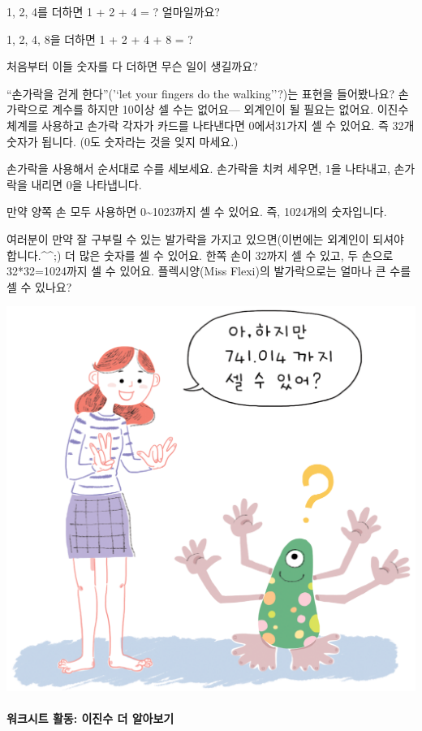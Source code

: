 \documentclass[]{article}
\begin{document}
1, 2, 4를 더하면 1 + 2 + 4 = ? 얼마일까요?

1, 2, 4, 8을 더하면 1 + 2 + 4 + 8 = ?

처음부터 이들 숫자를 다 더하면 무슨 일이 생길까요?

``손가락을 걷게 한다''('`let your fingers do the walking''?)는 표현을
들어봤나요? 손가락으로 계수를 하지만 10이상 셀 수는 없어요--- 외계인이
될 필요는 없어요. 이진수 체계를 사용하고 손가락 각자가 카드를 나타낸다면
0에서31가지 셀 수 있어요. 즉 32개 숫자가 됩니다. (0도 숫자라는 것을 잊지
마세요.)

손가락을 사용해서 순서대로 수를 세보세요. 손가락을 치켜 세우면, 1을
나타내고, 손가락을 내리면 0을 나타냅니다.

만약 양쪽 손 모두 사용하면 0\textasciitilde{}1023까지 셀 수 있어요. 즉,
1024개의 숫자입니다.

여러분이 만약 잘 구부릴 수 있는 발가락을 가지고 있으면(이번에는 외계인이
되셔야 합니다.\^{}\^{};) 더 많은 숫자를 셀 수 있어요. 한쪽 손이 32까지
셀 수 있고, 두 손으로 32*32=1024까지 셀 수 있어요. 플렉시양(Miss
Flexi)의 발가락으로는 얼마나 큰 수를 셀 수 있나요?

\includegraphics{csunplugged/01-part/img/ch01-binary/01-binary-08-Miss-Flexi-Toes.png}

\mbox{}\paragraph{워크시트 활동: 이진수 더 알아보기}\label{section-19}
\end{document}
